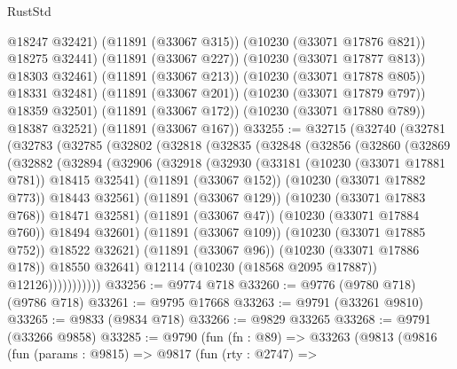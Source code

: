 \begin{lexlean}{RustStd}
\begin{coremodule}
                @18247
                @32421)
              (@11891 (@33067 @315))
              (@10230 (@33071 @17876 @821))
              @18275
              @32441)
            (@11891 (@33067 @227))
            (@10230 (@33071 @17877 @813))
            @18303
            @32461)
          (@11891 (@33067 @213))
          (@10230 (@33071 @17878 @805))
          @18331
          @32481)
        (@11891 (@33067 @201))
        (@10230 (@33071 @17879 @797))
        @18359
        @32501)
      (@11891 (@33067 @172))
      (@10230 (@33071 @17880 @789))
      @18387
      @32521)
    (@11891 (@33067 @167))
@33255 := @32715
    (@32740
      (@32781
        (@32783
          (@32785
            (@32802
              (@32818
                (@32835
                  (@32848
                    (@32856
                      (@32860
                        (@32869
                          (@32882
                            (@32894
                              (@32906
                                (@32918
                                  (@32930
                                    (@33181 (@10230 (@33071 @17881 @781)) @18415 @32541)
                                    (@11891 (@33067 @152))
                                    (@10230 (@33071 @17882 @773))
                                    @18443
                                    @32561)
                                  (@11891 (@33067 @129))
                                  (@10230 (@33071 @17883 @768))
                                  @18471
                                  @32581)
                                (@11891 (@33067 @47))
                                (@10230 (@33071 @17884 @760))
                                @18494
                                @32601)
                              (@11891 (@33067 @109))
                              (@10230 (@33071 @17885 @752))
                              @18522
                              @32621)
                            (@11891 (@33067 @96))
                            (@10230 (@33071 @17886 @178))
                            @18550
                            @32641)
                          @12114
                          (@10230 (@18568 @2095 @17887))
                          @12126)))))))))))
@33256 := @9774 @718
@33260 := @9776 (@9780 @718) (@9786 @718)
@33261 := @9795 @17668
@33263 := @9791 (@33261 @9810)
@33265 := @9833 (@9834 @718)
@33266 := @9829 @33265
@33268 := @9791 (@33266 @9858)
@33285 := @9790
    (fun (fn : @89) =>
    @33263
      (@9813
        (@9816
          (fun (params : @9815) =>
          @9817
            (fun (rty : @2747) =>

\end{coremodule}
\end{lexlean}
